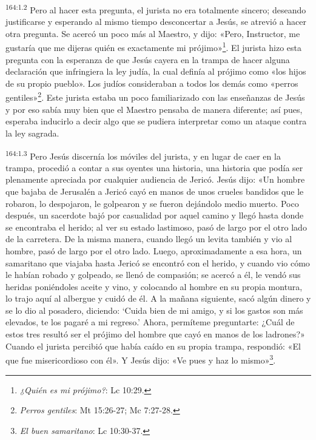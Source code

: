 \par 
\textsuperscript{164:1.2} Pero al hacer esta pregunta, el jurista no era totalmente sincero; deseando justificarse y esperando al mismo tiempo desconcertar a Jesús, se atrevió a hacer otra pregunta. Se acercó un poco más al Maestro, y dijo: «Pero, Instructor, me gustaría que me dijeras quién es exactamente mi prójimo»\footnote{\textit{¿Quién es mi prójimo?}: Lc 10:29.}. El jurista hizo esta pregunta con la esperanza de que Jesús cayera en la trampa de hacer alguna declaración que infringiera la ley judía, la cual definía al prójimo como «los hijos de su propio pueblo». Los judíos consideraban a todos los demás como «perros gentiles»\footnote{\textit{Perros gentiles}: Mt 15:26-27; Mc 7:27-28.}. Este jurista estaba un poco familiarizado con las enseñanzas de Jesús y por eso sabía muy bien que el Maestro pensaba de manera diferente; así pues, esperaba inducirlo a decir algo que se pudiera interpretar como un ataque contra la ley sagrada.

\par 
\textsuperscript{164:1.3} Pero Jesús discernía los móviles del jurista, y en lugar de caer en la trampa, procedió a contar a sus oyentes una historia, una historia que podía ser plenamente apreciada por cualquier audiencia de Jericó. Jesús dijo: «Un hombre que bajaba de Jerusalén a Jericó cayó en manos de unos crueles bandidos que le robaron, lo despojaron, le golpearon y se fueron dejándolo medio muerto. Poco después, un sacerdote bajó por casualidad por aquel camino y llegó hasta donde se encontraba el herido; al ver su estado lastimoso, pasó de largo por el otro lado de la carretera. De la misma manera, cuando llegó un levita también y vio al hombre, pasó de largo por el otro lado. Luego, aproximadamente a esa hora, un samaritano que viajaba hasta Jericó se encontró con el herido, y cuando vio cómo le habían robado y golpeado, se llenó de compasión; se acercó a él, le vendó sus heridas poniéndoles aceite y vino, y colocando al hombre en su propia montura, lo trajo aquí al albergue y cuidó de él. A la mañana siguiente, sacó algún dinero y se lo dio al posadero, diciendo: `Cuida bien de mi amigo, y si los gastos son más elevados, te los pagaré a mi regreso.' Ahora, permíteme preguntarte: ¿Cuál de estos tres resultó ser el prójimo del hombre que cayó en manos de los ladrones?» Cuando el jurista percibió que había caído en su propia trampa, respondió: «El que fue misericordioso con él». Y Jesús dijo: «Ve pues y haz lo mismo»\footnote{\textit{El buen samaritano}: Lc 10:30-37.}.

